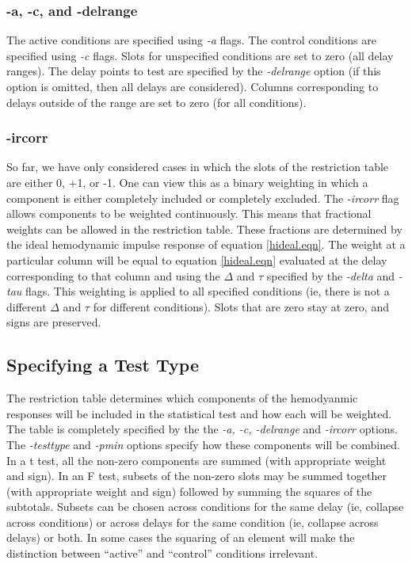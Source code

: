 \documentclass[10pt]{article}
\begin{document}
\subsubsection{-a, -c, and -delrange}

The active conditions are specified using {\em
-a} flags. The control conditions are specified using {\em -c} flags.
Slots for unspecified conditions are set to zero (all delay ranges).
The delay points to test are specified by the {\em -delrange} option
(if this option is omitted, then all delays are considered).  Columns
corresponding to delays outside of the range are set to zero
(for all conditions).

\subsubsection{-ircorr}

So far, we have only considered cases in which the slots of the
restriction table are either 0, +1, or -1.  One can view this
as a binary weighting in which a component is either completely
included or completely excluded.  The {\em -ircorr} flag allows
components to be weighted continuously.  This means that fractional
weights can be allowed in the restriction table.  These fractions are
determined by the ideal hemodynamic impulse response of equation
\ref{hideal.eqn}.  The weight at a particular column will be equal
to equation \ref{hideal.eqn} evaluated at the delay corresponding
to that column and using the $\Delta$ and $\tau$ specified by the
{\em -delta} and {\em -tau} flags.  This weighting is applied to
all specified conditions (ie, there is not a different $\Delta$ and
$\tau$ for different conditions).  Slots that are zero stay at zero,
and signs are preserved.

\subsection{Specifying a Test Type}

The restriction table determines which components of the hemodyanmic
responses will be included in the statistical test and how each will
be weighted. The table is completely specified by the the {\em -a, -c,
-delrange} and {\em -ircorr} options.  The {\em -testtype} and {\em
-pmin} options specify how these components will be combined.  In a t
test, all the non-zero components are summed (with appropriate weight
and sign).  In an F test, subsets of the non-zero slots may be summed
together (with appropriate weight and sign) followed by summing the
squares of the subtotals.  Subsets can be chosen across conditions
for the same delay (ie, collapse across conditions) or across delays
for the same condition (ie, collapse across delays) or both.  In some
cases the squaring of an element will make the distinction between
``active'' and ``control'' conditions irrelevant.
\end{document}
